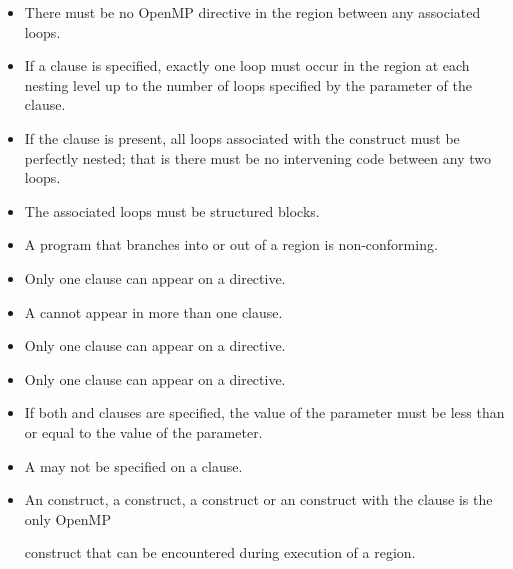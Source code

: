 \restrictions
\begin{itemize}
\item There must be no OpenMP directive in the region between any
associated loops.

\item If a  clause is specified, exactly one loop must
occur in the region at each nesting level up to the number of loops
specified by the parameter of the  clause.

\item If the  clause is present, all loops associated
with the construct must be perfectly nested; that is there must be
no intervening code between any two loops.

\item The associated loops must be structured blocks.

\item A program that branches into or out of a  region is non-conforming.

\item Only one  clause can appear on a  directive.

\item A  cannot appear in more than one  clause.

\item Only one  clause can appear on a  directive.

\item Only one  clause can appear on a  directive.

\item If both  and  clauses are specified, the value of the  parameter must be less than or equal to the value of the  parameter.

\item A  may not be specified on a  clause.

\item An  construct, a  construct, a  construct or an  construct with the  clause is the only OpenMP

construct that can be encountered during execution of a 
region.

\bigskip


\end{itemize}
